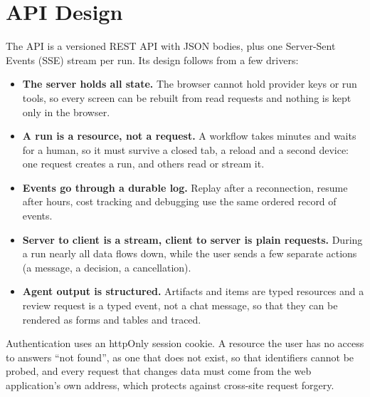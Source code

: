 \section{API Design}
\label{sec:sd-api}

The API is a versioned REST API with JSON bodies, plus one Server-Sent Events (SSE) stream per run. Its design follows from a few drivers:
\begin{itemize}
    \item \textbf{The server holds all state.} The browser cannot hold provider keys or run tools, so every screen can be rebuilt from read requests and nothing is kept only in the browser.
    \item \textbf{A run is a resource, not a request.} A workflow takes minutes and waits for a human, so it must survive a closed tab, a reload and a second device: one request creates a run, and others read or stream it.
    \item \textbf{Events go through a durable log.} Replay after a reconnection, resume after hours, cost tracking and debugging use the same ordered record of events.
    \item \textbf{Server to client is a stream, client to server is plain requests.} During a run nearly all data flows down, while the user sends a few separate actions (a message, a decision, a cancellation).
    \item \textbf{Agent output is structured.} Artifacts and items are typed resources and a review request is a typed event, not a chat message, so that they can be rendered as forms and tables and traced.
\end{itemize}
Authentication uses an httpOnly session cookie. A resource the user has no access to answers ``not found'', as one that does not exist, so that identifiers cannot be probed, and every request that changes data must come from the web application's own address, which protects against cross-site request forgery.

